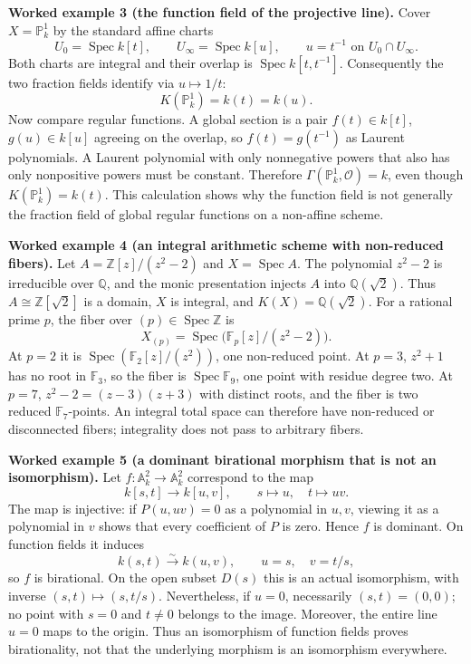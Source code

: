 \par\medskip
\noindent\textbf{Worked example 3 (the function field of the projective line).}
Cover $X=\mathbb P^1_k$ by the standard affine charts
\[
 U_0=\operatorname{Spec}k[t],\qquad
 U_\infty=\operatorname{Spec}k[u],\qquad u=t^{-1}
 \text{ on }U_0\cap U_\infty.
\]
Both charts are integral and their overlap is
$\operatorname{Spec}k[t,t^{-1}]$.  Consequently the two fraction fields
identify via $u\mapsto1/t$:
\[
 K(\mathbb P^1_k)=k(t)=k(u).
\]
Now compare regular functions.  A global section is a pair
$f(t)\in k[t]$, $g(u)\in k[u]$ agreeing on the overlap, so
$f(t)=g(t^{-1})$ as Laurent polynomials.  A Laurent polynomial with
only nonnegative powers that also has only nonpositive powers must
be constant.  Therefore
$\Gamma(\mathbb P^1_k,\mathcal O)=k$, even though
$K(\mathbb P^1_k)=k(t)$.
This calculation shows why the function field is not generally the
fraction field of global regular functions on a non-affine scheme.

\par\medskip
\noindent\textbf{Worked example 4 (an integral arithmetic scheme with non-reduced fibers).}
Let $A=\mathbb Z[z]/(z^2-2)$ and $X=\operatorname{Spec}A$.
The polynomial $z^2-2$ is irreducible over $\mathbb Q$, and the monic
presentation injects $A$ into $\mathbb Q(\sqrt2)$.
Thus $A\cong\mathbb Z[\sqrt2]$ is a domain,
$X$ is integral, and $K(X)=\mathbb Q(\sqrt2)$.
For a rational prime $p$, the fiber over $(p)\in\operatorname{Spec}\mathbb Z$
is
\[
 X_{(p)}=\operatorname{Spec}\bigl(\mathbb F_p[z]/(z^2-2)\bigr).
\]
At $p=2$ it is $\operatorname{Spec}(\mathbb F_2[z]/(z^2))$, one
non-reduced point.  At $p=3$, $z^2+1$ has no root in $\mathbb F_3$,
so the fiber is $\operatorname{Spec}\mathbb F_9$, one point with
residue degree two.  At $p=7$,
$z^2-2=(z-3)(z+3)$ with distinct roots, and the fiber is two reduced
$\mathbb F_7$-points.  An integral total space can therefore have
non-reduced or disconnected fibers; integrality does not pass to
arbitrary fibers.

\par\medskip
\noindent\textbf{Worked example 5 (a dominant birational morphism that is not an isomorphism).}
Let $f:\mathbb A^2_k\to\mathbb A^2_k$ correspond to the map
\[
 k[s,t]\longrightarrow k[u,v],\qquad s\longmapsto u,
 \quad t\longmapsto uv.
\]
The map is injective: if $P(u,uv)=0$ as a polynomial in $u,v$,
viewing it as a polynomial in $v$ shows that every coefficient
of $P$ is zero.  Hence $f$ is dominant.  On function fields it induces
\[
 k(s,t)\xrightarrow{\sim}k(u,v),\qquad
 u=s,\quad v=t/s,
\]
so $f$ is birational.  On the open subset $D(s)$ this is an actual
isomorphism, with inverse $(s,t)\mapsto(s,t/s)$.
Nevertheless, if $u=0$, necessarily $(s,t)=(0,0)$; no point with
$s=0$ and $t\ne0$ belongs to the image.  Moreover, the entire
line $u=0$ maps to the origin.  Thus an isomorphism of function fields
proves birationality, not that the underlying morphism is an
isomorphism everywhere.
